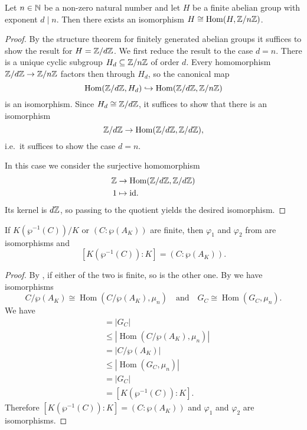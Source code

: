 \documentclass[12pt]{amsart}
\DeclareMathOperator{\Hom}{Hom}
\newcommand{\id}{\mathrm{id}}
\begin{document}
\begin{lm}\label{lm:finiteduality}
    Let $n\in \mathbb{N}$ be a non-zero natural number and let $H$ be a finite abelian group with exponent $d\mid n$.
    Then there exists an isomorphism $H\cong \Hom(H,\Z/n\Z)$.
    \begin{proof}
	By the structure theorem for finitely generated abelian groups it suffices to show the result for $H=\mathbb{Z}/d\mathbb{Z}$.
	We first reduce the result to the case $d=n$.
	There is a unique cyclic subgroup $H_{d}\subseteq \mathbb{Z}/n\mathbb{Z}$ of order $d$.
	Every homomorphism $\mathbb{Z}/d\mathbb{Z}\to \mathbb{Z}/n\mathbb{Z}$ factors then through $H_{d}$, so the canonical map
	\[ \Hom(\Z/d\Z,H_{d})\hookrightarrow \Hom(\Z/d\Z,\Z/n\Z) \]
	is an isomorphism.
	Since $H_{d}\cong \mathbb{Z}/d\mathbb{Z}$, it suffices to show that there is an isomorphism
	\[ \Z/d\Z\to \Hom(\Z/d\Z,\Z/d\Z), \]
	i.e.~it suffices to show the case $d=n$.

	In this case we consider the surjective homomorphism
	\begin{align*}
	    \Z & \to \Hom(\Z/d\Z,\Z/d\Z) \\
	    1 & \mapsto \id.
	\end{align*}
	Its kernel is $d\mathbb{Z}$, so passing to the quotient yields the desired isomorphism.
    \end{proof}
\end{lm}

\begin{prop}\label{prop:index}
    If $K(\wp^{-1}(C))/K$ or $(C:\wp(A_{K}))$ are finite, then $\varphi_{1}$ and $\varphi_{2}$ from  are isomorphisms and
    \[ [K(\wp^{-1}(C)):K]=(C:\wp(A_{K})). \]
    \begin{proof}
	By , if either of the two is finite, so is the other one.
	By  we have isomorphisms
	\[ C/\wp(A_{K})\cong \Hom(C/\wp(A_{K}),\mu_{n})\quad\text{and}\quad G_{C}\cong \Hom(G_{C},\mu_{n}). \]
	We have
	\begin{align*}
	    [K(\wp^{-1}(C)):K] & = |G_{C}| \\
	    & \leqslant |\Hom(C/\wp(A_{K}),\mu_{n})| \\
	    & = |C/\wp(A_{K})| \\
	    & \leqslant |\Hom(G_{C},\mu_{n}) | \\
	    & = |G_{C}| \\
	    & =[K(\wp^{-1}(C)):K].
	\end{align*}
	Therefore $[K(\wp^{-1}(C)):K]=(C:\wp(A_{K}))$ and $\varphi_{1}$ and $\varphi_{2}$ are isomorphisms.
    \end{proof}
\end{prop}

\newpage


\vfill
\end{document}
